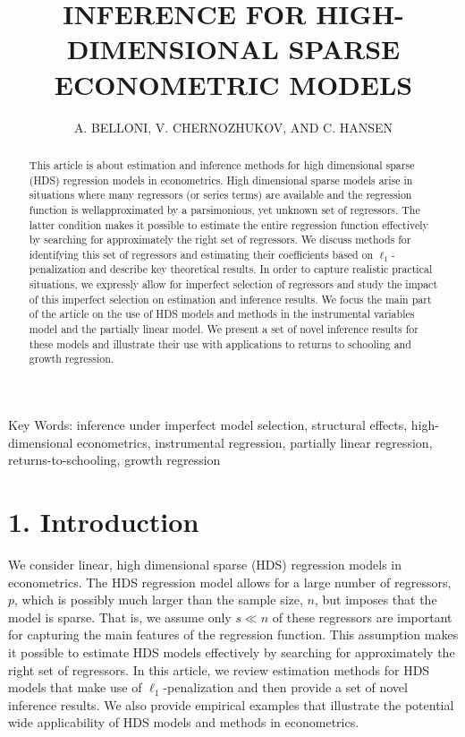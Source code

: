 \documentclass[10pt]{article}
\title{INFERENCE FOR HIGH-DIMENSIONAL SPARSE ECONOMETRIC MODELS }
\author{A. BELLONI, V. CHERNOZHUKOV, AND C. HANSEN}
\date{}
\begin{document}
\maketitle


\begin{abstract}
This article is about estimation and inference methods for high dimensional sparse (HDS) regression models in econometrics. High dimensional sparse models arise in situations where many regressors (or series terms) are available and the regression function is wellapproximated by a parsimonious, yet unknown set of regressors. The latter condition makes it possible to estimate the entire regression function effectively by searching for approximately the right set of regressors. We discuss methods for identifying this set of regressors and estimating their coefficients based on \(\ell_{1}\)-penalization and describe key theoretical results. In order to capture realistic practical situations, we expressly allow for imperfect selection of regressors and study the impact of this imperfect selection on estimation and inference results. We focus the main part of the article on the use of HDS models and methods in the instrumental variables model and the partially linear model. We present a set of novel inference results for these models and illustrate their use with applications to returns to schooling and growth regression.
\end{abstract}

Key Words: inference under imperfect model selection, structural effects, high-dimensional econometrics, instrumental regression, partially linear regression, returns-to-schooling, growth regression

\section*{1. Introduction}
We consider linear, high dimensional sparse (HDS) regression models in econometrics. The HDS regression model allows for a large number of regressors, \(p\), which is possibly much larger than the sample size, \(n\), but imposes that the model is sparse. That is, we assume only \(s \ll n\) of these regressors are important for capturing the main features of the regression function. This assumption makes it possible to estimate HDS models effectively by searching for approximately the right set of regressors. In this article, we review estimation methods for HDS models that make use of \(\ell_{1}\)-penalization and then provide a set of novel inference results. We also provide empirical examples that illustrate the potential wide applicability of HDS models and methods in econometrics.
\end{document}
